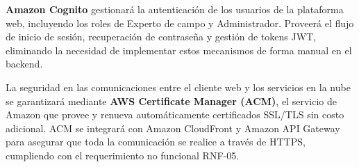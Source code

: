 \textbf{Amazon Cognito} gestionará la autenticación de los usuarios
de la plataforma web, incluyendo los roles de Experto de campo y
Administrador. Proveerá el flujo de inicio de sesión, recuperación
de contraseña y gestión de tokens JWT, eliminando la necesidad de
implementar estos mecanismos de forma manual en el backend.

La seguridad en las comunicaciones entre el cliente web y los servicios en la nube se garantizará mediante \textbf{AWS Certificate Manager (ACM)}, el servicio de Amazon que provee y renueva automáticamente certificados SSL/TLS sin costo adicional. ACM se integrará con Amazon CloudFront y Amazon API Gateway para asegurar que toda la comunicación se realice a través de HTTPS, cumpliendo con el requerimiento no funcional RNF-05.